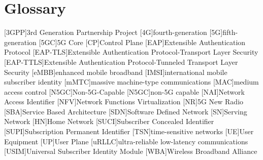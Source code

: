 \chapter{Glossary}

\footnotesize
\SingleSpacing

\begin{acronym}[AAAAAA]
	[3GPP]{3rd Generation Partnership Project}
	[4G]{fourth-generation}
	[5G]{fifth-generation}
	[5GC]{5G Core}
	[CP]{Control Plane}
	[EAP]{Extensible Authentication Protocol}
	[EAP-TLS]{Extensible Authentication Protocol-Transport Layer Security}
	[EAP-TTLS]{Extensible Authentication Protocol-Tunneled Transport Layer Security}
	[eMBB]{enhanced mobile broadband}
	[IMSI]{international mobile subscriber identity}
	[mMTC]{massive machine-type communications}
	[MAC]{medium access control}
	[N5GC]{Non-5G-Capable}
	[N5GC]{non-5G capable}
	[NAI]{Network Access Identifier}
	[NFV]{Network Functions Virtualization}
	[NR]{5G New Radio}
	[SBA]{Service Based Architecture}
	[SDN]{Software Defined Network}
	[SN]{Serving Network}
	[HN]{Home Network}
	[SUCI]{Subscriber Concealed Identifier}
	[SUPI]{Subscription Permanent Identifier}
	[TSN]{time-sensitive networks}
	[UE]{User Equipment}
	[UP]{User Plane}
	[uRLLC]{ultra-reliable low-latency communications}
	[USIM]{Universal Subscriber Identity Module}
	[WBA]{Wireless Broadband Alliance}
\end{acronym}